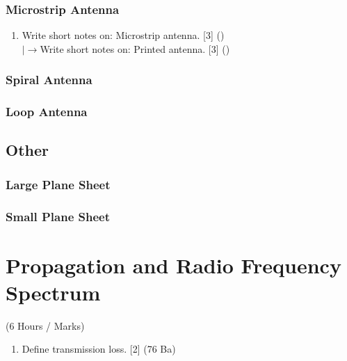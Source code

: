 \documentclass[12pt]{article}
\newcommand{\lb}{\\$\left|\rightarrow\right.$}
\begin{document}
    \subsubsection{Microstrip Antenna}
      \begin{enumerate}
        \item Write short notes on: Microstrip antenna. \hfill [3] ()
          \lb Write short notes on: Printed antenna. \hfill [3] ()
      \end{enumerate}
    \subsubsection{Spiral Antenna}
    
    \subsubsection{Loop Antenna}

  \subsection{Other}
    \subsubsection{Large Plane Sheet}
    \subsubsection{Small Plane Sheet}

\pagebreak

\section{Propagation and Radio Frequency Spectrum}
  \begin{center} (6 Hours / Marks) \end{center}
  
  \begin{enumerate}
    

    
    \item Define transmission loss. \hfill [2] (76 Ba)
  \end{enumerate}
\end{document}
